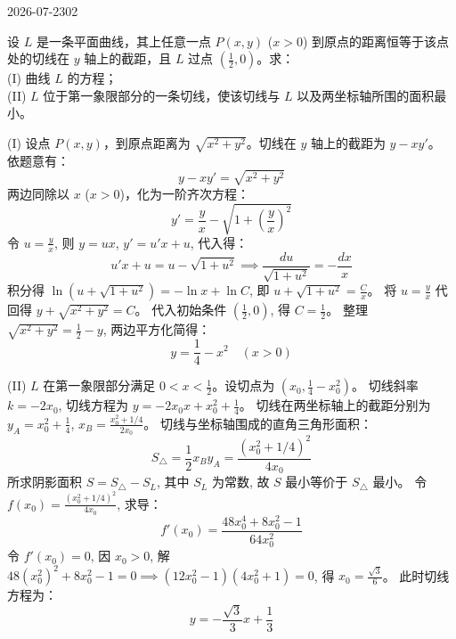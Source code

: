 \begin{mistake}{2026-07-23}{02}

\begin{problemcontent}
设 \(L\) 是一条平面曲线，其上任意一点 \(P(x,y)\) (\(x>0\)) 到原点的距离恒等于该点处的切线在 \(y\) 轴上的截距，且 \(L\) 过点 \((\frac{1}{2},0)\)。求：\\
(I) 曲线 \(L\) 的方程；\\
(II) \(L\) 位于第一象限部分的一条切线，使该切线与 \(L\) 以及两坐标轴所围的面积最小。
\end{problemcontent}

\begin{solutioncontent}
(I) 设点 \(P(x,y)\)，到原点距离为 \(\sqrt{x^2+y^2}\)。切线在 \(y\) 轴上的截距为 \(y - x y'\)。
依题意有：
\[ y - x y' = \sqrt{x^2+y^2} \]
两边同除以 \(x\) (\(x>0\))，化为一阶齐次方程：
\[ y' = \frac{y}{x} - \sqrt{1+\left(\frac{y}{x}\right)^2} \]
令 \(u = \frac{y}{x}\), 则 \(y = ux\), \(y' = u'x + u\), 代入得：
\[ u'x + u = u - \sqrt{1+u^2} \implies \frac{du}{\sqrt{1+u^2}} = -\frac{dx}{x} \]
积分得 \(\ln(u + \sqrt{1+u^2}) = -\ln x + \ln C\), 即 \(u + \sqrt{1+u^2} = \frac{C}{x}\)。
将 \(u = \frac{y}{x}\) 代回得 \(y + \sqrt{x^2+y^2} = C\)。
代入初始条件 \((\frac{1}{2},0)\), 得 \(C = \frac{1}{2}\)。
整理 \(\sqrt{x^2+y^2} = \frac{1}{2} - y\), 两边平方化简得：
\[ y = \frac{1}{4} - x^2 \quad (x>0) \]

(II) \(L\) 在第一象限部分满足 \(0 < x < \frac{1}{2}\)。设切点为 \((x_0, \frac{1}{4}-x_0^2)\)。
切线斜率 \(k = -2x_0\), 切线方程为 \(y = -2x_0 x + x_0^2 + \frac{1}{4}\)。
切线在两坐标轴上的截距分别为 \(y_A = x_0^2 + \frac{1}{4}\), \(x_B = \frac{x_0^2 + 1/4}{2x_0}\)。
切线与坐标轴围成的直角三角形面积：
\[ S_{\triangle} = \frac{1}{2} x_B y_A = \frac{(x_0^2 + 1/4)^2}{4x_0} \]
所求阴影面积 \(S = S_{\triangle} - S_L\), 其中 \(S_L\) 为常数, 故 \(S\) 最小等价于 \(S_{\triangle}\) 最小。
令 \(f(x_0) = \frac{(x_0^2 + 1/4)^2}{4x_0}\), 求导：
\[ f'(x_0) = \frac{48x_0^4 + 8x_0^2 - 1}{64x_0^2} \]
令 \(f'(x_0) = 0\), 因 \(x_0>0\), 解 \(48(x_0^2)^2 + 8x_0^2 - 1 = 0 \implies (12x_0^2 - 1)(4x_0^2 + 1) = 0\), 得 \(x_0 = \frac{\sqrt{3}}{6}\)。
此时切线方程为：
\[ y = -\frac{\sqrt{3}}{3} x + \frac{1}{3} \]
\end{solutioncontent}


\end{mistake}
